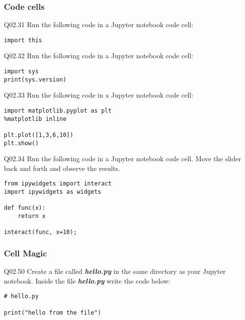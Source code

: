 \documentclass{book}
\newenvironment{problems}{}{}  %
\begin{document}
    
        \begin{problems}
        \hypertarget{code-cells}{%
\subsubsection{Code cells}\label{code-cells}}

Q02.31 Run the following code in a Jupyter notebook code cell:

\begin{lstlisting}
import this
\end{lstlisting}

Q02.32 Run the following code in a Jupyter notebook code cell:

\begin{lstlisting}
import sys
print(sys.version)
\end{lstlisting}

Q02.33 Run the following code in a Jupyter notebook code cell:

\begin{lstlisting}
import matplotlib.pyplot as plt
%matplotlib inline

plt.plot([1,3,6,10])
plt.show()
\end{lstlisting}

Q02.34 Run the following code in a Jupyter notebook code cell. Move the
slider back and forth and observe the results.

\begin{lstlisting}
from ipywidgets import interact
import ipywidgets as widgets

def func(x):
    return x
    
interact(func, x=10);
\end{lstlisting}
        \end{problems}

    




    
        \hypertarget{cell-magic}{%
\subsubsection{Cell Magic}\label{cell-magic}}

Q02.50 Create a file called \textbf{\emph{hello.py}} in the same
directory as your Jupyter notebook. Inside the file
\textbf{\emph{hello.py}} write the code below:

\begin{lstlisting}
# hello.py

print("hello from the file")
\end{lstlisting}
\end{document}
